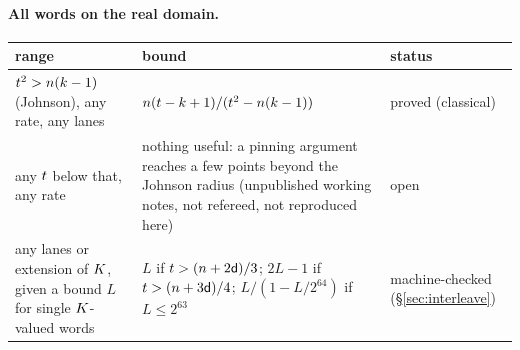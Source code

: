 \paragraph{All words on the real domain.}
\begin{center}
\small
\begin{tabularx}{\textwidth}{@{}L{0.34\textwidth}YL{0.2\textwidth}@{}}
\toprule
range & bound & status\\
\midrule
$t^2>n(k-1)$ (Johnson), any rate, any lanes & $n(t-k+1)/(t^2-n(k-1))$ & proved (classical)\\
any $t$ below that, any rate & nothing useful: a pinning argument reaches a few points beyond the Johnson radius (unpublished working notes, not refereed, not reproduced here) & open\\
any lanes or extension of $K$, given a bound $L$ for single $K$-valued words & $L$ if $t>(n+2\mathsf{d})/3$; $2L-1$ if $t>(n+3\mathsf{d})/4$; $L/(1-L/2^{64})$ if $L\le2^{63}$ & machine-checked (\S\ref{sec:interleave})\\
\bottomrule
\end{tabularx}
\end{center}


